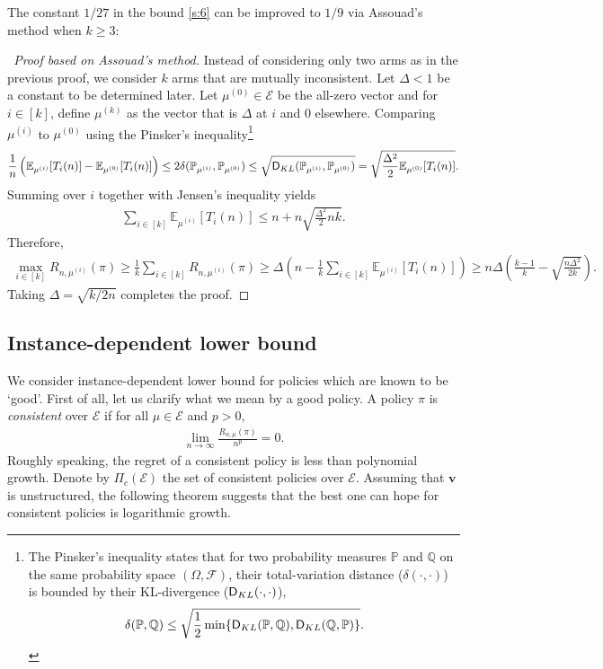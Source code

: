 \documentclass[letterpaper,10pt,openright,openany]{book}
\numberwithin{equation}{section}
\theoremstyle{plain}
\theoremstyle{definition}
\def\Q{{\mathbb Q}}
\def\E{{\mathbb E}}
\def\P{{\mathbb P}}
\def\V{{\mathcal E}}
\def\v{{\mathbf{v}}}
\begin{document}
The constant $1/27$ in the bound \eqref{s:6} can be improved to $1/9$ via Assouad's method when $k\geq 3$: 

\begin{proof}[~Proof based on Assouad's method]
Instead of considering only two arms as in the previous proof, we consider $k$ arms that are mutually inconsistent. Let $\Delta<1$ be a constant to be determined later. Let $\mu^{(0)}\in\mathcal E$ be the all-zero vector and for $i\in [k]$, define $\mu^{(k)}$ as the vector that is $\Delta$ at $i$ and $0$ elsewhere. Comparing $\mu^{(i)}$ to $\mu^{(0)}$ using the Pinsker's inequality\footnote{The Pinsker's inequality states that for two probability measures $\P$ and $\Q$ on the same probability space $(\Omega, \mathcal{F})$, their total-variation distance ($\delta(\cdot, \cdot)$) is bounded by their KL-divergence ($\textsf D_{KL}(\cdot, \cdot)$), 
\begin{align}
\delta (\P, \Q)\leq\sqrt{\frac{1}{2}\min\{\textsf D_{KL}(\P, \Q), \textsf D_{KL}(\Q, \P)\}}. \label{s:pinsker}
\end{align}} 
\begin{align*}
\frac{1}{n}\left(\E_{\mu^{(i)}}[T_i(n)]-\E_{\mu^{(0)}}[T_i(n)]\right)\leq 2\delta(\P_{\mu^{(i)}}, \P_{\mu^{(0)}})\leq\sqrt{\textsf D_{KL}(\P_{\mu^{(i)}}, \P_{\mu^{(0)}})}=\sqrt{\frac{\Delta^2}{2}\E_{\mu^{(0)}}[T_i(n)]}. 
\end{align*}
Summing over $i$ together with Jensen's inequality yields
\begin{align*}
\sum_{i\in [k]}\E_{\mu^{(i)}}[T_i(n)]\leq n+n\sqrt{\frac{\Delta^2}{2}nk}. 
\end{align*}
Therefore,
\begin{align*}
\max_{i\in [k]}R_{n, \mu^{(i)}}(\pi)\geq\frac{1}{k}\sum_{i\in [k]}R_{n, \mu^{(i)}}(\pi)\geq \Delta\left(n-\frac{1}{k}\sum_{i\in [k]}\E_{\mu^{(i)}}[T_i(n)]\right)\geq n\Delta\left(\frac{k-1}{k}-\sqrt{\frac{n\Delta^2}{2k}}\right). 
\end{align*}
Taking $\Delta=\sqrt{k/2n}$ completes the proof. 
\end{proof}


\subsection{Instance-dependent lower bound}

We consider instance-dependent lower bound for policies which are known to be `good'. First of all, let us clarify what we mean by a good policy. A policy $\pi$ is \emph{consistent} over $\V$ if for all $\mu\in\V$ and $p>0$, 
\begin{align*}
\lim_{n\rightarrow\infty}\frac{R_{n, \mu}(\pi)}{n^p} = 0. 
\end{align*}
Roughly speaking, the regret of a consistent policy is less than polynomial growth. Denote by $\Pi_{c}(\V)$ the set of consistent policies over $\V$. Assuming that $\v$ is unstructured, the following theorem suggests that the best one can hope for consistent policies is logarithmic growth. 
\end{document}
